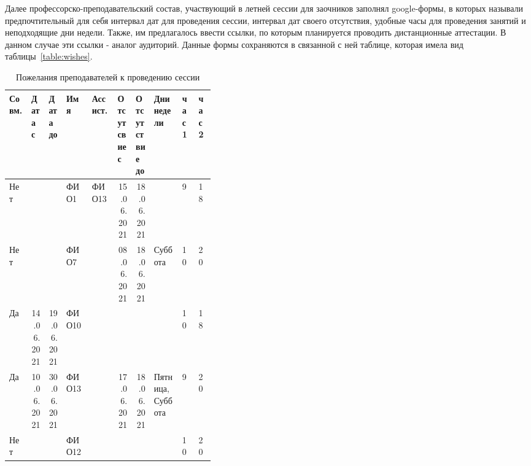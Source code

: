 \FloatBarrier

Далее профессорско-преподавательский состав, участвующий в летней сессии для заочников заполнял google-формы, в которых называли предпочтительный для себя интервал дат для проведения сессии, интервал дат своего отсутствия, удобные часы для проведения занятий и неподходящие дни недели. Также, им предлагалось ввести ссылки, по которым планируется проводить дистанционные аттестации. В данном случае эти ссылки - аналог аудиторий. Данные формы сохраняются в связанной с ней таблице, которая имела вид таблицы~\ref{table:wishes}.

\begin{table}[htbp]
	\centering\small 
	\caption{Пожелания преподавателей к проведению сессии}
	\begin{tabular}{|p{0.05\linewidth}|p{0.02\linewidth}|p{0.02\linewidth}|p{0.07\linewidth}|p{0.07\linewidth}|p{0.02\linewidth}|p{0.02\linewidth}|p{0.08\linewidth}|p{0.02\linewidth}|p{0.02\linewidth}|}
		\hline
		Совм. & Дата с                          & Дата до                         & Имя   & Ассист.                & Отсутсвие с                     & Отсутствие до                   & Дни недели                    & час 1& час 2 \\ \hline
		Нет          &                                 &                                 & ФИО1  & ФИО13 & \multicolumn{1}{r|}{15.06.2021} & \multicolumn{1}{r|}{18.06.2021} &                               & 9                         & 18                        \\ \hline
		Нет          &                                 &                                 & ФИО7  &                           & \multicolumn{1}{r|}{08.06.2021} & \multicolumn{1}{r|}{18.06.2021} & Суббота                       & 10                        & 20                        \\ \hline
		Да           & \multicolumn{1}{r|}{14.06.2021} & \multicolumn{1}{r|}{19.06.2021} & ФИО10 &                           &                                 &                                 &                               & 10                        & 18                        \\ \hline
		Да           & \multicolumn{1}{r|}{10.06.2021} & \multicolumn{1}{r|}{30.06.2021} & ФИО13 &                           & \multicolumn{1}{r|}{17.06.2021} & \multicolumn{1}{r|}{18.06.2021} & Пятница, Суббота              & 9                         & 20                        \\ \hline
		Нет          &                                 &                                 & ФИО12 &                           &                                 &                                 &                               & 10                        & 20                        \\ \hline

\end{tabular}
\end{table}
